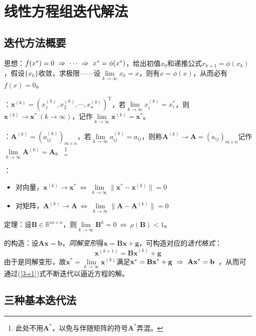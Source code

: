 \chapter{线性方程组迭代解法}
\section{迭代方法概要}


\entry 思想：$f(x^{\ast})=0\ \Rightarrow\ \cdots\ \Rightarrow\  x^{\ast}=\phi(x^{\ast})$，给出初值$x_0$和递推公式$x_{k+1}=\phi(x_k)$，假设$\{x_k\}$收敛，求极限——设$\lim\limits_{k\to\infty}x_k=x$，则有$x=\phi(x)$，从而必有$f(x)=0$。

 {}：$\mathbf{x}^{(k)}=(x_1^{(k)},x_2^{(k)},\cdots,x_n^{(k)})^{\mathrm{T}}$，若$\lim\limits_{k\to\infty}x_i^{(k)}=x_i^{\ast}$，则$\mathbf{x}^{(k)}\to\mathbf{x}^{\ast}\ (k\to\infty)$，记作$\lim\limits_{k\to\infty}\mathbf{x}^{(k)}=\mathbf{x}^{\ast}$。

 {}：$\mathbf{A}^{(k)}=(a_{ij}^{(k)})_{m\times n}$，若$\lim\limits_{k\to\infty}a_{ij}^{(k)}=a_{ij}$，则称$\mathbf{A}^{(k)}\to\mathbf{A}=(a_{ij})_{m\times n}$记作$\lim\limits_{k\to\infty}\mathbf{A}^{(k)}=\mathbf{A}$。
\footnote{此处不用$\mathbf{A}^\ast$，以免与伴随矩阵的符号$\mathbf{A}^\ast$弄混。}

\trm {}：
\begin{itemize}\tl
    \item 对向量，$\mathbf{x}^{(k)}\to\mathbf{x}^\ast\ \Leftrightarrow\ \lim\limits_{k\to\infty}\|\mathbf{x}^\ast-\mathbf{x}^{(k)}\|=0$
    \item 对矩阵，$\mathbf{A}^{(k)}\to\mathbf{A}\ \Leftrightarrow\ \lim\limits_{k\to\infty}\|\mathbf{A}-\mathbf{A}^{(k)}\|=0$
\end{itemize}

\trm 定理：设$\mathbf{B}\in\mathbb{R}^{m\times n}$，则$\lim\limits_{k\to\infty}\mathbf{B}^k=0\ \Leftrightarrow\ \rho(\mathbf{B})<1$。

\entry {}的构造：设$\mathbf{Ax=b}$，\emph{同解变形}得$\mathbf{x=Bx+g}$，可构造对应的\emph{迭代格式}：
\begin{equation}\label{3-e1}
    \mathbf{x}^{(k+1)}=\mathbf{Bx}^{(k)}+\mathbf{g}
\end{equation}
由于是同解变形，故$\mathbf{x}^\ast=\lim\limits_{k\to\infty}\mathbf{x}^{(k)}$满足$\mathbf{x}^\ast=\mathbf{Bx}^\ast+\mathbf{g}\ \Rightarrow\ \mathbf{Ax}^\ast=\mathbf{b}$\ ，从而可通过(\ref{3-e1})式不断迭代以逼近方程的解。


\section{三种基本迭代法}

